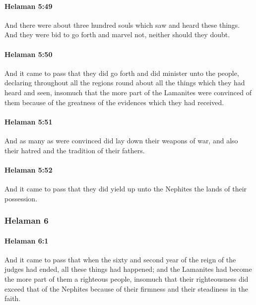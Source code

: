 		\paragraph{Helaman 5:49} %
			\label{HELAMAN-5-49}

			And there were about three hundred souls which saw and heard these things.
			And they were bid to go forth and marvel not,
			neither should they doubt.

		\paragraph{Helaman 5:50} %
			\label{HELAMAN-5-50}

			And it came to pass that they did go forth and did minister unto the people,
			declaring throughout all the regions round about
			all the things which they had heard and seen,
			insomuch that the more part of the Lamanites were convinced of them
			because of the greatness of the evidences which they had received.

		\paragraph{Helaman 5:51} %
			\label{HELAMAN-5-51}

			And as many as were convinced did lay down their weapons of war,
			and also their hatred and the tradition of their fathers.

		\paragraph{Helaman 5:52} %
			\label{HELAMAN-5-52}

			And it came to pass that
			they did yield up unto the Nephites the lands of their possession.

	\subsubsection{Helaman 6} %
		\label{HELAMAN-6}
		
		\paragraph{Helaman 6:1} %
			\label{HELAMAN-6-1}

			And it came to pass that when the sixty and second year
			of the reign of the judges had ended,
			all these things had happened;
			and the Lamanites had become the more part of them a righteous people,
			insomuch that their righteousness did exceed that of the Nephites
			because of their firmness and their steadiness in the faith.

